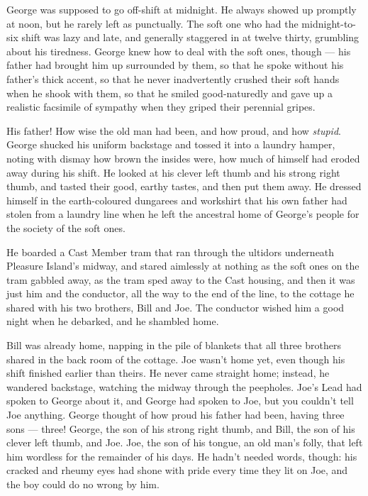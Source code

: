 \tb

George was supposed to go off-shift at midnight. He always showed
up promptly at noon, but he rarely left as punctually. The soft one
who had the midnight-to-six shift was lazy and late, and generally
staggered in at twelve thirty, grumbling about his tiredness.
George knew how to deal with the soft ones, though --- his father
had brought him up surrounded by them, so that he spoke without his
father's thick accent, so that he never inadvertently crushed their
soft hands when he shook with them, so that he smiled
good-naturedly and gave up a realistic facsimile of sympathy when
they griped their perennial gripes.

His father! How wise the old man had been, and how proud, and how
\emph{stupid}. George shucked his uniform backstage and tossed it
into a laundry hamper, noting with dismay how brown the insides
were, how much of himself had eroded away during his shift. He
looked at his clever left thumb and his strong right thumb, and
tasted their good, earthy tastes, and then put them away. He
dressed himself in the earth-coloured dungarees and workshirt that
his own father had stolen from a laundry line when he left the
ancestral home of George's people for the society of the soft
ones.

He boarded a Cast Member tram that ran through the ultidors
underneath Pleasure Island's midway, and stared aimlessly at
nothing as the soft ones on the tram gabbled away, as the tram sped
away to the Cast housing, and then it was just him and the
conductor, all the way to the end of the line, to the cottage he
shared with his two brothers, Bill and Joe. The conductor wished
him a good night when he debarked, and he shambled home.

Bill was already home, napping in the pile of blankets that all
three brothers shared in the back room of the cottage. Joe wasn't
home yet, even though his shift finished earlier than theirs. He
never came straight home; instead, he wandered backstage, watching
the midway through the peepholes. Joe's Lead had spoken to George
about it, and George had spoken to Joe, but you couldn't tell Joe
anything. George thought of how proud his father had been, having
three sons --- three! George, the son of his strong right thumb,
and Bill, the son of his clever left thumb, and Joe. Joe, the son
of his tongue, an old man's folly, that left him wordless for the
remainder of his days. He hadn't needed words, though: his cracked
and rheumy eyes had shone with pride every time they lit on Joe,
and the boy could do no wrong by him.

